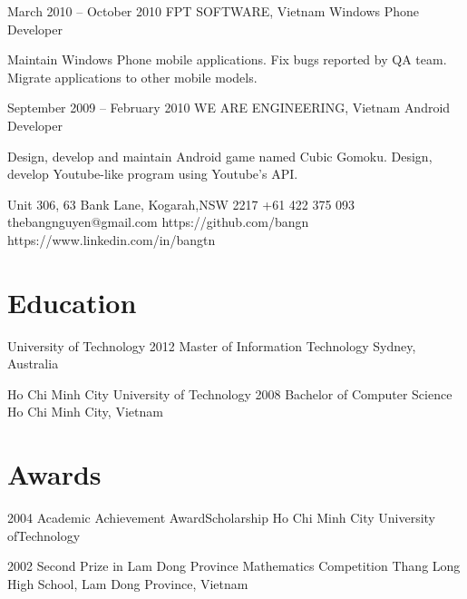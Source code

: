 \documentclass{tccv}
\begin{document}
\begin{eventlist}
\item{March 2010 -- October 2010}
     {FPT SOFTWARE, Vietnam}
     {Windows Phone Developer}

Maintain Windows Phone mobile applications.
Fix bugs reported by QA team.
Migrate applications to other mobile models.

\item{September 2009 -- February 2010}
     {WE ARE ENGINEERING, Vietnam}
     {Android Developer}

Design, develop and maintain Android game named Cubic Gomoku.
Design, develop Youtube-like program using Youtube's API.

\end{eventlist}

\personal
    {Unit 306, 63 Bank Lane, Kogarah,\newline NSW 2217}
    {+61 422 375 093}
    {thebangnguyen@gmail.com}
    {https://github.com/bangn}
    {https://www.linkedin.com/in/bangtn}

\section{Education}

\begin{yearlist}

\item[University of Technology]{2012}
     {Master of Information Technology}
     {Sydney, Australia}

\item[Ho Chi Minh City University of Technology]{2008}
     {Bachelor of Computer Science}
     {Ho Chi Minh City, Vietnam}

\end{yearlist}

\section{Awards}

\begin{yearlist}

\item{2004}
     {Academic Achievement Award\newline Scholarship}
     {Ho Chi Minh City University of\newline Technology}

\item{2002}
     {Second Prize in Lam Dong Province Mathematics Competition}
     {Thang Long High School, Lam Dong Province, Vietnam}

\end{yearlist}
\end{document}
